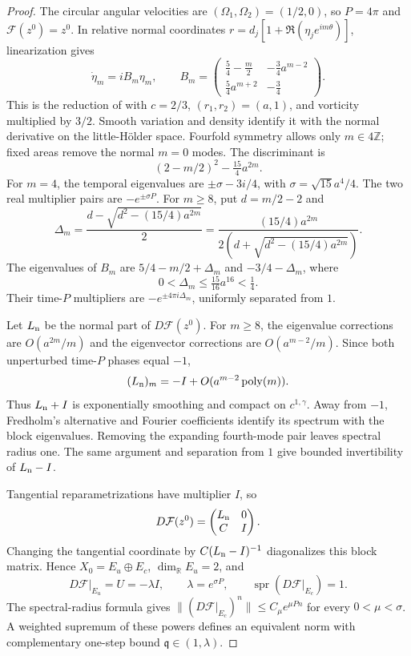 \documentclass[11pt]{amsart}
\theoremstyle{remark}
\numberwithin{equation}{section}
\newcommand{\R}{\mathbb R}
\newcommand{\C}{\mathbb C}
\begin{document}
\begin{proof}
The circular angular velocities are $(\Omega_1,\Omega_2)=(1/2,0)$,
so $P=4\pi$ and $\mathcal F(z^0)=z^0$.
In relative normal coordinates
$r=d_j[1+\Re(\eta_je^{im\theta})]$, linearization gives
\[
 \dot\eta_m=iB_m\eta_m,\qquad
 B_m=\begin{pmatrix}
 \frac54-\frac m2&-\frac34a^{m-2}\\
 \frac54a^{m+2}&-\frac34
 \end{pmatrix}.
\]
This is the reduction of \cite[Section~3]{CFMS} with $c=2/3$,
$(r_1,r_2)=(a,1)$, and vorticity multiplied by $3/2$.
Smooth variation and density identify it with the normal derivative
on the little-H\"older space. Fourfold symmetry allows only
$m\in4\mathbb Z$; fixed areas remove the normal $m=0$ modes.
The discriminant is
\[
 (2-m/2)^2-\tfrac{15}{4}a^{2m}.
\]
For $m=4$, the temporal eigenvalues are
$\pm\sigma-3i/4$, with $\sigma=\sqrt{15}a^4/4$.
The two real multiplier pairs are $-e^{\pm\sigma P}$.
For $m\ge8$, put $d=m/2-2$ and
\[
 \Delta_m=\frac{d-\sqrt{d^2-(15/4)a^{2m}}}{2}
 =\frac{(15/4)a^{2m}}{2(d+\sqrt{d^2-(15/4)a^{2m}})}.
\]
The eigenvalues of $B_m$ are $5/4-m/2+\Delta_m$ and
$-3/4-\Delta_m$, where
\[
 0<\Delta_m\le\tfrac{15}{16}a^{16}<\tfrac14.
\]
Their time-$P$ multipliers are $-e^{\pm4\pi i\Delta_m}$,
uniformly separated from $1$.

Let $L_{\rm n}$ be the normal part of $D\mathcal F(z^0)$.
For $m\ge8$, the eigenvalue corrections are $O(a^{2m}/m)$ and
the eigenvector corrections are $O(a^{m-2}/m)$. Since both
unperturbed time-$P$ phases equal $-1$,
\[
 (L_{\rm n})_m=-I+O(a^{m-2}\operatorname{poly}(m)).
\]
Thus $L_{\rm n}+I$ is exponentially smoothing and compact on
$c^{1,\gamma}$. Away from $-1$, Fredholm's alternative and
Fourier coefficients identify its spectrum with the block
eigenvalues. Removing the expanding fourth-mode pair leaves
spectral radius one. The same argument and separation from $1$
give bounded invertibility of $L_{\rm n}-I$.

Tangential reparametrizations have multiplier $I$, so
\[
 D\mathcal F(z^0)=\begin{pmatrix}L_{\rm n}&0\\C&I\end{pmatrix}.
\]
Changing the tangential coordinate by $C(L_{\rm n}-I)^{-1}$
diagonalizes this block matrix. Hence
$X_0=E_u\oplus E_c$, $\dim_\R E_u=2$, and
\[
 D\mathcal F|_{E_u}=U=-\lambda I,\qquad\lambda=e^{\sigma P},
 \qquad\operatorname{spr}(D\mathcal F|_{E_c})=1.
\]
The spectral-radius formula gives
$\|(D\mathcal F|_{E_c})^n\|\le C_\mu e^{\mu Pn}$ for every
$0<\mu<\sigma$. A weighted supremum of these powers defines an
equivalent norm with complementary one-step bound
$\mathfrak q\in(1,\lambda)$.
\end{proof}
\end{document}
